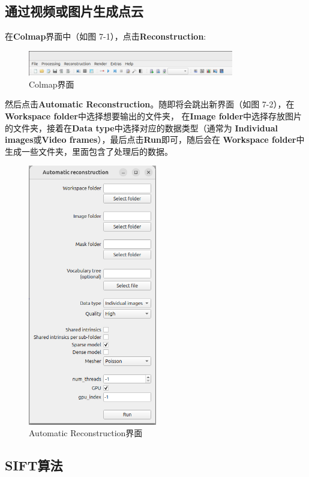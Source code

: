 \documentclass{nwputhesis}
\begin{document}
\subsection{通过视频或图片生成点云}
在\textbf{Colmap}界面中（如图 7-1），点击\textbf{Reconstruction}:
\begin{figure}[H]
    \centering
    \includegraphics[width=0.8\textwidth]{picture/21.png}
    \caption{Colmap界面}
\end{figure}
\indent
然后点击\textbf{Automatic Reconstruction}。随即将会跳出新界面（如图 7-2），在\textbf{Workspace folder}中选择想要输出的文件夹，
在\textbf{Image folder}中选择存放图片的文件夹，接着在\textbf{Data type}中选择对应的数据类型（通常为
\textbf{Individual images}或\textbf{Video frames}），最后点击\textbf{Run}即可，随后会在
\textbf{Workspace folder}中生成一些文件夹，里面包含了处理后的数据。
\begin{figure}[H]
    \centering
    \includegraphics[width=0.5\textwidth]{picture/22.png}
    \caption{Automatic Reconstruction界面}
\end{figure}

\makespace
\hypertarget{SIFT}{}
\subsection{SIFT算法}
\end{document}
